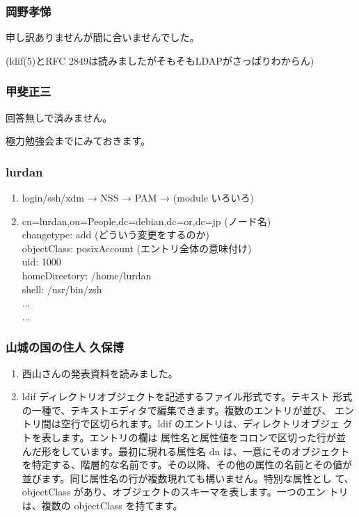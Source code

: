 \documentclass[cjk,dvipdfmx,10pt,%
hyperref={bookmarks=true,bookmarksnumbered=true,bookmarksopen=false,%
colorlinks=false,%
pdftitle={第 61 回 関西 Debian 勉強会},%
pdfauthor={倉敷・のがた・かわだ・佐々木},%
pdfsubject={資料},%
}]{beamer}
\begin{document}
\begin{frame}
  \frametitle{ 岡野孝悌 }
  申し訳ありませんが間に合いませんでした。

  (ldif(5)とRFC 2849は読みましたがそもそもLDAPがさっぱりわからん)
\end{frame}

\begin{frame}
  \frametitle{ 甲斐正三 }
  回答無しで済みません。

  極力勉強会までにみておきます。
\end{frame}

\begin{frame}
  \frametitle{ lurdan }
  \begin{enumerate}
  \item login/ssh/xdm → NSS → PAM → (module いろいろ)
  \item
    cn=lurdan,ou=People,dc=debian,dc=or,dc=jp (ノード名)\\
    changetype: add (どういう変更をするのか)\\
    objectClass: posixAccount (エントリ全体の意味付け)\\
    uid: 1000\\
    homeDirectory: /home/lurdan\\
    shell: /usr/bin/zsh\\
    ...\\
    ...
  \end{enumerate}
\end{frame}

\begin{frame}
  \frametitle{ 山城の国の住人 久保博 }
  \begin{enumerate}
  \item 西山さんの発表資料を読みました。
  \item ldif ディレクトリオブジェクトを記述するファイル形式です。テキスト
    形式の一種で、テキストエディタで編集できます。複数のエントリが並び、
    エントリ間は空行で区切られます。ldif のエントリは、ディレクトリオブジェ
    クトを表します。エントリの欄は 属性名と属性値をコロンで区切った行が並
    んだ形をしています。最初に現れる属性名 dn は、一意にそのオブジェクト
    を特定する、階層的な名前です。その以降、その他の属性の名前とその値が
    並びます。同じ属性名の行が複数現れても構いません。特別な属性とし
    て、objectClass があり、オブジェクトのスキーマを表します。一つのエン
    トリは、複数の objectClass を持てます。
  \end{enumerate}
\end{frame}
\end{document}
